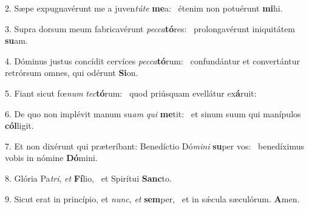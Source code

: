 2. Sæpe expugnavérunt me a juven\textit{tú}\textit{te} \textbf{me}a: \ast\  étenim non potuérunt \textbf{mi}hi.\

3. Supra dorsum meum fabricavérunt \textit{pec}\textit{ca}\textbf{tó}res: \ast\  prolongavérunt iniquitátem \textbf{su}am.\

4. Dóminus justus concídit cervíces \textit{pec}\textit{ca}\textbf{tó}rum: \ast\  confundántur et convertántur retrórsum omnes, qui odérunt \textbf{Si}on.\

5. Fiant sicut fœ\textit{num} \textit{tec}\textbf{tó}rum: \ast\  quod priúsquam evellátur ex\textbf{á}ruit:\

6. De quo non implévit manum su\textit{am} \textit{qui} \textbf{me}tit: \ast\  et sinum suum qui manípulos \textbf{cól}ligit.\

7. Et non dixérunt qui præteríbant: Benedíctio Dó\textit{mi}\textit{ni} \textbf{su}per vos: \ast\  benedíximus vobis in nómine \textbf{Dó}mini.\

8. Glória Pa\textit{tri}, \textit{et} \textbf{Fí}lio, \ast\  et Spirítui \textbf{Sanc}to.\

9. Sicut erat in princípio, et \textit{nunc}, \textit{et} \textbf{sem}per, \ast\  et in sǽcula sæculórum. \textbf{A}men.\

